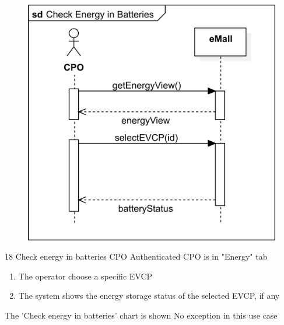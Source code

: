 \pagebreak
\usecase
{
    \begin{figure}[H]
        \centering
        \includegraphics[scale=0.9]{src/sequence_diagram/checkEnergy.png}
    \end{figure}
}
{18}
{Check energy in batteries} %
{CPO} %
{Authenticated CPO is in "Energy" tab} %
{ %
    \begin{enumerate}
        \item The operator choose a specific EVCP
        \item The system shows the energy storage status of the selected EVCP, if any
    \end{enumerate}
}
{The 'Check energy in batteries' chart is shown} %
{ %
    No exception in this use case
}
{ %
}

